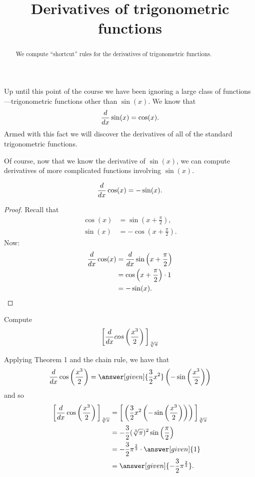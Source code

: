 \documentclass{ximera}
\title[Dig-In:]{Derivatives of trigonometric functions}
\begin{document}
\begin{abstract}
We compute ``shortcut'' rules for the derivatives of trigonometric functions.
\end{abstract}
\maketitle

Up until this point of the course we have been ignoring a large class
of functions---trigonometric functions other than $\sin(x)$. We know that
\[
\frac{d}{dx} \sin(x) = \cos(x).
\]
Armed with this fact we will discover the derivatives of all of the
standard trigonometric functions.


Of course, now that we know the derivative of $\sin(x)$, we can compute
derivatives of more complicated functions involving $\sin(x)$.


\begin{theorem}
\[
\frac{d}{dx} \cos(x) = -\sin(x).
\]
\begin{proof}
Recall that
\begin{align*}
\cos(x) &= \sin\left(x+\frac{\pi}{2}\right), \\
\sin(x) &= -\cos\left(x+\frac{\pi}{2}\right).
\end{align*}
Now:
\begin{align*}
\frac{d}{dx} \cos(x) &= \frac{d}{dx} \sin\left(x+\frac{\pi}{2}\right)\\
&=\cos\left(x+\frac{\pi}{2}\right)\cdot 1 \\
&= -\sin(x).
\end{align*}
\end{proof}
\end{theorem}

\begin{example}
Compute
\[
\bigg[ \frac{d}{dx} cos \left( \frac{x^3}{2} \right) \bigg]_{\sqrt[3]{\pi}}
\]
\begin{explanation}
Applying Theorem 1 and the chain rule, we have that
\[
\ddx \cos \left( \frac{x^3}{2} \right) = \answer[given]{\frac{3}{2} x^2} \left(- \sin \left( \frac{x^3}{2} \right) \right)
\]
and so
\begin{align*}
\eval{\ddx \cos \left( \frac{x^3}{2} \right)}_{\sqrt[3]{\pi}} &= \eval{\left( \frac{3}{2} x^2 \left(- \sin \left( \frac{x^3}{2} \right) \right) \right)}_{\sqrt[3]{\pi}}  \\
&= - \frac{3}{2} (\sqrt[3]{\pi})^2 \sin \left( \frac{\pi}{2} \right)  \\
&= - \frac{3}{2} \pi^{\frac{2}{3}} \cdot \answer[given]{1}  \\
&= \answer[given]{ - \frac{3}{2} \pi^{\frac{2}{3}}}.
\end{align*}
\end{explanation}
\end{example}
\end{document}
